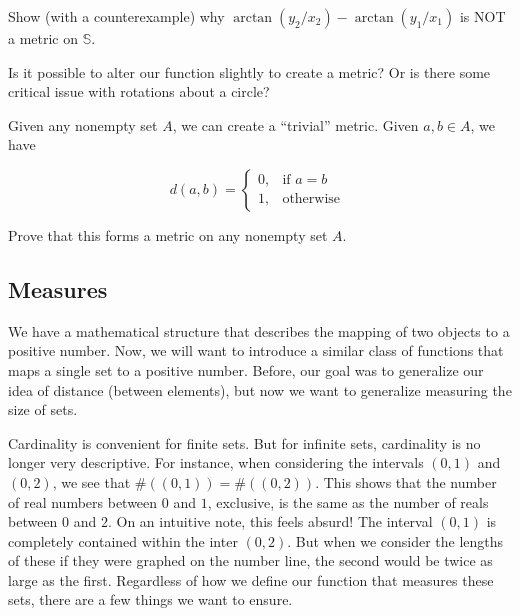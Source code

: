 \begin{exercise}
    Show (with a counterexample) why $\arctan(y_2/x_2)-\arctan(y_1/x_1)$ is NOT a metric on $\mathbb{S}$.
\end{exercise}

\begin{exercise}
    Is it possible to alter our function slightly to create a metric? Or is there some critical issue with rotations about a circle?
\end{exercise}

Given any nonempty set $A$, we can create a ``trivial'' metric. Given $a,b\in A$, we have

\begin{equation}
d(a,b) = 
\left\{
    \begin{array}{lr}
        0, & \text{if } a=b\\
        1, & \text{otherwise }
    \end{array}
\right. 
\end{equation}

\begin{exercise}
    Prove that this forms a metric on any nonempty set $A$.
\end{exercise}

\subsection{Measures}

We have a mathematical structure that describes the mapping of two objects to a positive number. Now, we will want to introduce a similar class of functions that maps a single set to a positive number. Before, our goal was to generalize our idea of distance (between elements), but now we want to generalize measuring the size of sets. 

Cardinality is convenient for finite sets. But for infinite sets, cardinality is no longer very descriptive. For instance, when considering the intervals $(0,1)$ and $(0,2)$, we see that $\#((0,1))=\#((0,2))$. This shows that the number of real numbers between $0$ and $1$, exclusive, is the same as the number of reals between $0$ and $2$. On an intuitive note, this feels absurd! The interval $(0,1)$ is completely contained within the inter $(0,2)$. But when we consider the lengths of these if they were graphed on the number line, the second would be twice as large as the first. Regardless of how we define our function that measures these sets, there are a few things we want to ensure. 

